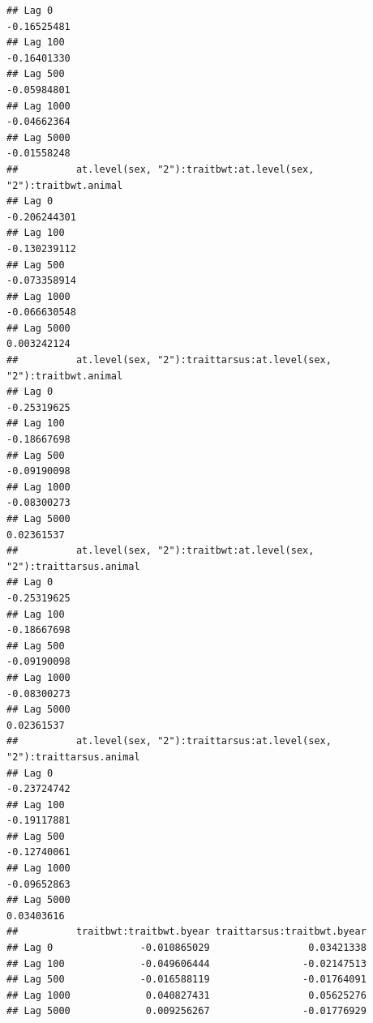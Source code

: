 \documentclass[
  12pt,
]{book}
\begin{document}
\begin{verbatim}
## Lag 0                                                             -0.16525481
## Lag 100                                                           -0.16401330
## Lag 500                                                           -0.05984801
## Lag 1000                                                          -0.04662364
## Lag 5000                                                          -0.01558248
##          at.level(sex, "2"):traitbwt:at.level(sex, "2"):traitbwt.animal
## Lag 0                                                      -0.206244301
## Lag 100                                                    -0.130239112
## Lag 500                                                    -0.073358914
## Lag 1000                                                   -0.066630548
## Lag 5000                                                    0.003242124
##          at.level(sex, "2"):traittarsus:at.level(sex, "2"):traitbwt.animal
## Lag 0                                                          -0.25319625
## Lag 100                                                        -0.18667698
## Lag 500                                                        -0.09190098
## Lag 1000                                                       -0.08300273
## Lag 5000                                                        0.02361537
##          at.level(sex, "2"):traitbwt:at.level(sex, "2"):traittarsus.animal
## Lag 0                                                          -0.25319625
## Lag 100                                                        -0.18667698
## Lag 500                                                        -0.09190098
## Lag 1000                                                       -0.08300273
## Lag 5000                                                        0.02361537
##          at.level(sex, "2"):traittarsus:at.level(sex, "2"):traittarsus.animal
## Lag 0                                                             -0.23724742
## Lag 100                                                           -0.19117881
## Lag 500                                                           -0.12740061
## Lag 1000                                                          -0.09652863
## Lag 5000                                                           0.03403616
##          traitbwt:traitbwt.byear traittarsus:traitbwt.byear
## Lag 0               -0.010865029                 0.03421338
## Lag 100             -0.049606444                -0.02147513
## Lag 500             -0.016588119                -0.01764091
## Lag 1000             0.040827431                 0.05625276
## Lag 5000             0.009256267                -0.01776929

\end{verbatim}
\end{document}
